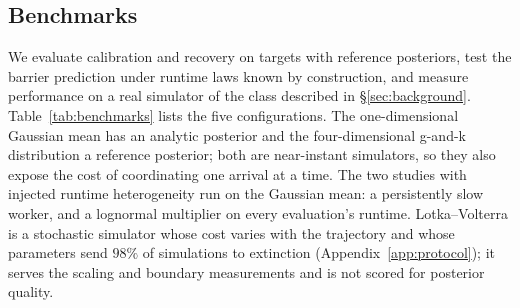 \documentclass[10pt]{article}
\theoremstyle{plain}
\theoremstyle{definition}
\begin{document}
\subsection{Benchmarks}\label{sec:experiments-suite}
We evaluate calibration and recovery on targets with reference posteriors, test the barrier prediction under runtime laws known by construction, and measure performance on a real simulator of the class described in \S\ref{sec:background}. Table~\ref{tab:benchmarks} lists the five configurations. The one-dimensional Gaussian mean has an analytic posterior and the four-dimensional g-and-k distribution \citep{rayner2002gk} a reference posterior; both are near-instant simulators, so they also expose the cost of coordinating one arrival at a time. The two studies with injected runtime heterogeneity run on the Gaussian mean: a persistently slow worker, and a lognormal multiplier on every evaluation's runtime. Lotka--Volterra is a stochastic simulator whose cost varies with the trajectory and whose parameters send $98\%$ of simulations to extinction (Appendix~\ref{app:protocol}); it serves the scaling and boundary measurements and is not scored for posterior quality.
\end{document}
